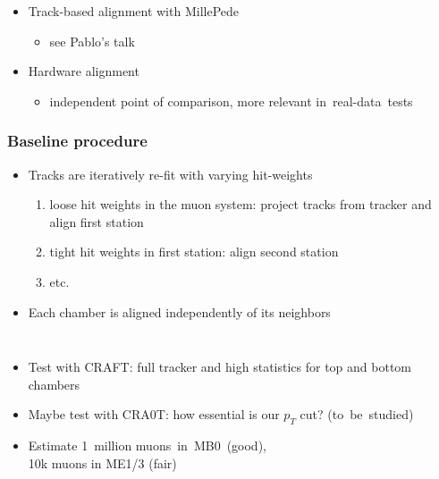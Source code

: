 \documentclass[compress]{beamer}
\begin{document}
\begin{frame}
\begin{itemize}
\item Track-based alignment with MillePede
\begin{itemize}
\item see Pablo's talk
\end{itemize}

\item Hardware alignment
\begin{itemize}
\item independent point of comparison, more relevant \mbox{in real-data tests\hspace{-1 cm}}
\end{itemize}

\end{itemize}
\end{frame}

\begin{frame}
\frametitle{Baseline procedure}

\begin{itemize}
\item Tracks are iteratively re-fit with varying hit-weights
\begin{enumerate}
\item loose hit weights in the muon system: project tracks from tracker and align first station
\item tight hit weights in first station: align second station
\item etc.
\end{enumerate}
\item Each chamber is aligned independently of its neighbors
\end{itemize}

\vfill
\begin{columns}
\begin{itemize}\setlength{\itemsep}{0.25 cm}
\item Test with CRAFT: full tracker and high statistics for top and bottom chambers

\item Maybe test with CRA0T: how essential is our $p_T$ cut? \mbox{(to be studied)\hspace{-1 cm}}

\item Estimate 1~million \mbox{muons in MB0 (good),\hspace{-2 cm}} \\ 10k muons in ME1/3 (fair)
\end{itemize}

\vspace{0.3 cm}\mbox{ }


\end{columns}
\end{frame}
\end{document}
